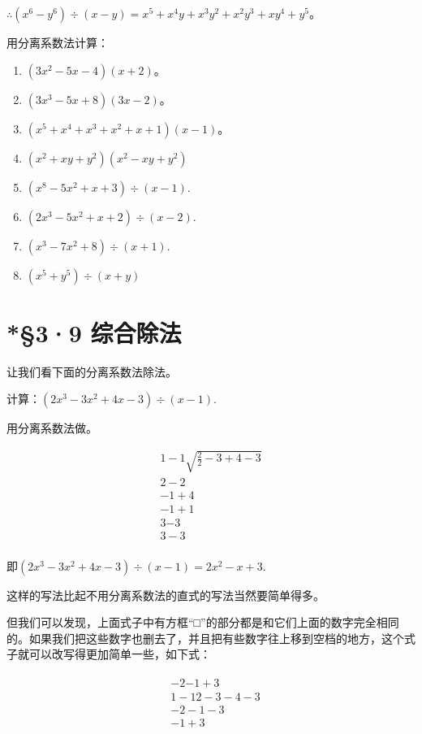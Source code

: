 \(\therefore (x^{6} - y^{6}) \div (x - y) = x^{5} + x^{4}y + x^{3}y^{2} + x^{2}y^{3} + xy^{4} + y^{5}\)。

用分离系数法计算：

\begin{enumerate}[start=1]
\item
  \((3x^{2} - 5x - 4)(x + 2)\)。
\item
  \((3x^{3} - 5x + 8)(3x - 2)\)。
\item
  \((x^{5} + x^{4} + x^{3} + x^{2} + x + 1)(x - 1)\)。
\item
  \((x^{2} + xy + y^{2})(x^{2} - xy + y^{2})\)
\item
  \((x^{8} - 5x^{2} + x + 3)\div (x - 1).\)
\item
  \((2x^{3} - 5x^{2} + x + 2)\div (x - 2).\)
\item
  \((x^{3} - 7x^{2} + 8)\div (x + 1).\)
\item
  \((x^{5} + y^{5})\div (x + y)\)
\end{enumerate}

\section{*§3·9 综合除法}

让我们看下面的分离系数法除法。

 计算：\((2x^{3} - 3x^{2} + 4x - 3)\div (x - 1).\)

 用分离系数法做。

\[
\begin{array}{l} 1 - 1 \sqrt {\frac{2}{2} - 3 + 4 - 3} \\ \boxed {2} - 2 \\ - 1 + 4 \\ \boxed {- 1} + 1 \\ 3 \boxed {- 3} \\ \boxed {3} - 3 \\ \end{array}
\]

即\((2x^{3} - 3x^{2} + 4x - 3)\div (x - 1) = 2x^{2} - x + 3.\)

这样的写法比起不用分离系数法的直式的写法当然要简单得多。

但我们可以发现，上面式子中有方框``□''的部分都是和它们上面的数字完全相同的。如果我们把这些数字也删去了，并且把有些数字往上移到空档的地方，这个式子就可以改写得更加简单一些，如下式：

\[
\begin{array}{rl} & \boxed { \begin{array}{c} - 2 \boxed {- 1 + 3} \\ 1 - 1 \boxed {2 - 3 - 4 - 3} \\ - 2 - 1 - 3 \\ - 1 + 3 \end{array} } \end{array}
\]

